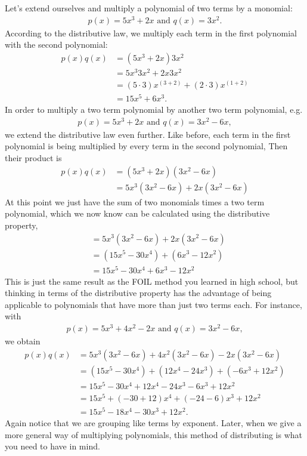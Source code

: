Let's extend ourselves and multiply a polynomial of two terms by a monomial:
\begin{align*} 
p(x)  = 5x^3 + 2x \text{ and }
q(x)  = 3x^2.
\end{align*}
According to the distributive law, we multiply each term in the first polynomial with the second polynomial:
\begin{align*}
p(x)  q(x) 
& = ( 5x^3 +2x)  3x^2 \\
&= 5x^3 3x^2 + 2x 3x^2\\
& = (5 \cdot 3)x^{(3 + 2)} + (2 \cdot 3)x^{(1+2)}\\ 
& = 15x^5 + 6x^3.
\end{align*}
In order to  multiply a two term polynomial by another two term polynomial, e.g.
\begin{align*} 
p(x)  = 5x^3 + 2x \text{ and } q(x)  = 3x^2 - 6x,
\end{align*}
we extend the distributive law even further.  Like before, each term in the first polynomial is being multiplied by every term in the second polynomial,
Then their product is
\begin{align*}
p(x)  q(x) 
& = ( 5x^3 +2x)  (3x^2 - 6x) \\
& = 5x^3 (3x^2 - 6x) +2x(3x^2 - 6x) 
\end{align*}
At this point we just have the sum of two monomials times a two term polynomial, which we now know can be calculated using the distributive property,
\begin{align*}
& = 5x^3 (3x^2 - 6x) +2x(3x^2 - 6x) \\
& = (15x^5 -30x^4) + (6x^3-12x^2)\\
&= 15x^5 - 30x^4 + 6x^3 - 12x^2
\end{align*}
This is just the same result as the FOIL method you learned in high school, but thinking in terms of the distributive property has the advantage of being applicable to polynomials that have more than just two terms each.  
For instance, with
\begin{align*}
p(x)  = 5x^3 + 4x^2 - 2x \text{ and } q(x)  = 3x^2 - 6x,
\end{align*}
we obtain
\begin{align*}
p(x) q(x)
& = 5x^3 (3x^2 - 6x) +4x^2(3x^2 - 6x)-2x(3x^2 - 6x) \\
& = (15x^5 -30x^4) + (12x^4 - 24x^3)  + (-6x^3 + 12x^2)\\
&= 15x^5 - 30x^4 + 12x^4-24x^3 - 6x^3 + 12x^2\\
&= 15x^5 + (-30+12)x^4 + (-24-6)x^3 +12x^2 \\
&= 15x^5 - 18x^4 - 30x^3 +12x^2.
\end{align*}
Again notice that we are grouping like terms by exponent.  Later, when we give a more general way of multiplying polynomials, this method of distributing is what you need to have in mind.

